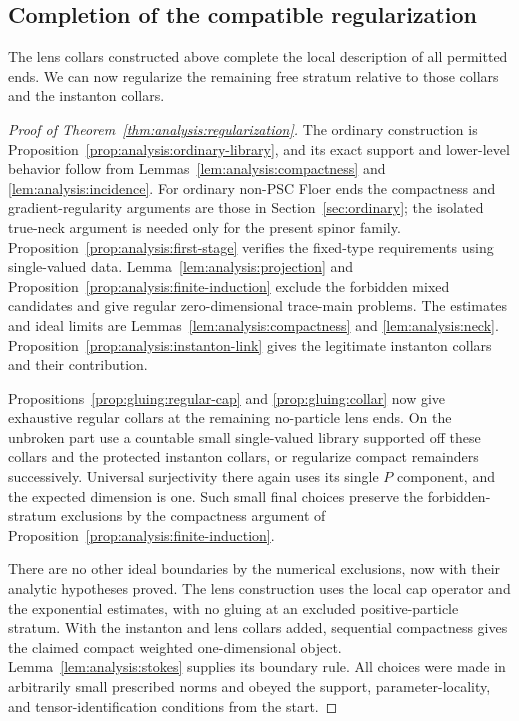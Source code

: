 \subsection{Completion of the compatible regularization}
\label{subsec:gluing:completion}

The lens collars constructed above complete the local description of
all permitted ends.  We can now regularize the remaining free stratum
relative to those collars and the instanton collars.

\begin{proof}[Proof of Theorem~\ref{thm:analysis:regularization}]
The ordinary construction is Proposition~\ref{prop:analysis:ordinary-library},
and its exact support and lower-level behavior follow from
Lemmas~\ref{lem:analysis:compactness} and \ref{lem:analysis:incidence}.
For ordinary non-PSC Floer ends the compactness and gradient-regularity
arguments are those in Section~\ref{sec:ordinary}; the isolated true-neck
argument is needed only for the present spinor family.
Proposition~\ref{prop:analysis:first-stage} verifies the fixed-type
requirements using single-valued data.  Lemma~\ref{lem:analysis:projection}
and Proposition~\ref{prop:analysis:finite-induction} exclude the forbidden
mixed candidates and give regular zero-dimensional trace-main problems.
The estimates and ideal limits are Lemmas~\ref{lem:analysis:compactness}
and \ref{lem:analysis:neck}.  Proposition~\ref{prop:analysis:instanton-link}
gives the legitimate instanton collars and their contribution.

Propositions~\ref{prop:gluing:regular-cap} and \ref{prop:gluing:collar}
now give exhaustive regular collars at the remaining no-particle lens
ends.  On the unbroken part use a countable small single-valued library
supported off these collars and the protected instanton collars, or
regularize compact remainders successively.  Universal surjectivity there
again uses its single $P$ component, and the expected dimension is one.
Such small final choices preserve the forbidden-stratum exclusions by
the compactness argument of
Proposition~\ref{prop:analysis:finite-induction}.

There are no other ideal boundaries by the numerical exclusions, now
with their analytic hypotheses proved.  The lens construction uses the
local cap operator and the exponential estimates, with no gluing at an
excluded positive-particle stratum.  With the instanton and lens collars
added, sequential compactness gives the claimed compact weighted
one-dimensional object.  Lemma~\ref{lem:analysis:stokes} supplies its
boundary rule.  All choices were made in arbitrarily small prescribed
norms and obeyed the support, parameter-locality, and tensor-identification
conditions from the start.
\end{proof}

